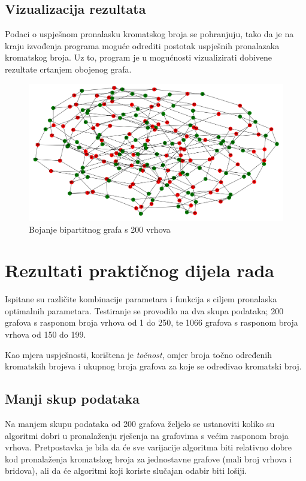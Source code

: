 \documentclass[times, utf8, zavrsni, numeric]{fer}
\begin{document}
\section{Vizualizacija rezultata}
Podaci o uspješnom pronalasku kromatskog broja se pohranjuju, tako da je na kraju izvođenja programa moguće odrediti postotak uspješnih pronalazaka kromatskog broja. Uz to, program je u mogućnosti vizualizirati dobivene rezultate crtanjem obojenog grafa.


\begin{figure}[htb]
\centering
\includegraphics[width=15cm]{images/200_vrhova_bipartitan_graf.png}
\caption{Bojanje bipartitnog grafa s 200 vrhova}
\label{fig:bojanje grafa s 200 vrhova}
\end{figure}

\chapter{Rezultati praktičnog dijela rada}
Ispitane su različite kombinacije parametara i funkcija s ciljem pronalaska optimalnih parametara. Testiranje se provodilo na dva skupa podataka; 200 grafova s rasponom broja vrhova od 1 do 250, te 1066 grafova s rasponom broja vrhova od 150 do 199.

Kao mjera uspješnosti, korištena je \textit{točnost}, omjer broja točno određenih kromatskih brojeva i ukupnog broja grafova za koje se određivao kromatski broj.


\section{Manji skup podataka}
Na manjem skupu podataka od 200 grafova željelo se ustanoviti koliko su algoritmi dobri u pronalaženju rješenja na grafovima s većim rasponom broja vrhova. Pretpostavka je bila da će sve varijacije algoritma biti relativno dobre kod pronalaženja kromatskog broja za jednostavne grafove (mali broj vrhova i bridova), ali da će algoritmi koji koriste slučajan odabir biti lošiji.
\end{document}
